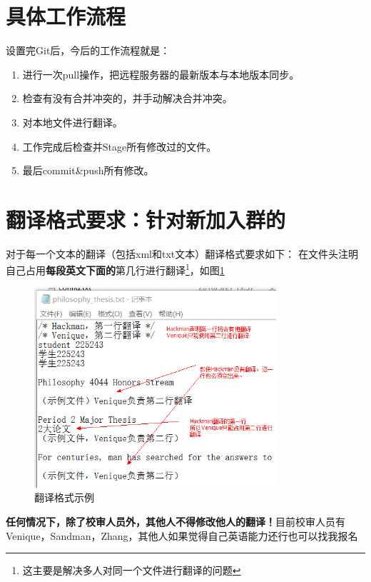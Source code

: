 \documentclass[10pt,a4paper,UTF8]{article}
\begin{document}
    \newpage

    \section{具体工作流程}
        设置完Git后，今后的工作流程就是：
        \begin{enumerate}[(1)]
            \item 进行一次pull操作，把远程服务器的最新版本与本地版本同步。
            \item 检查有没有合并冲突的，并手动解决合并冲突。
            \item 对本地文件进行翻译。
            \item 工作完成后检查并Stage所有修改过的文件。
            \item 最后commit\&push所有修改。
        \end{enumerate}

    \newpage

    \section{翻译格式要求：针对新加入群的}
        对于每一个文本的翻译（包括xml和txt文本）翻译格式要求如下：
        在文件头注明自己占用\textbf{每段英文下面的}第几行进行翻译\footnote{这主要是解决多人对同一个文件进行翻译的问题}，如图\ref{fig:format}
        \begin{figure}[H]
            \centering
            \includegraphics[width=0.8\textwidth]{format.png}
            \caption{翻译格式示例}
            \label{fig:format}
        \end{figure}

        \textbf{任何情况下，除了校审人员外，其他人不得修改他人的翻译！}目前校审人员有Venique，Sandman，Zhang，其他人如果觉得自己英语能力还行也可以找我报名
\end{document}
